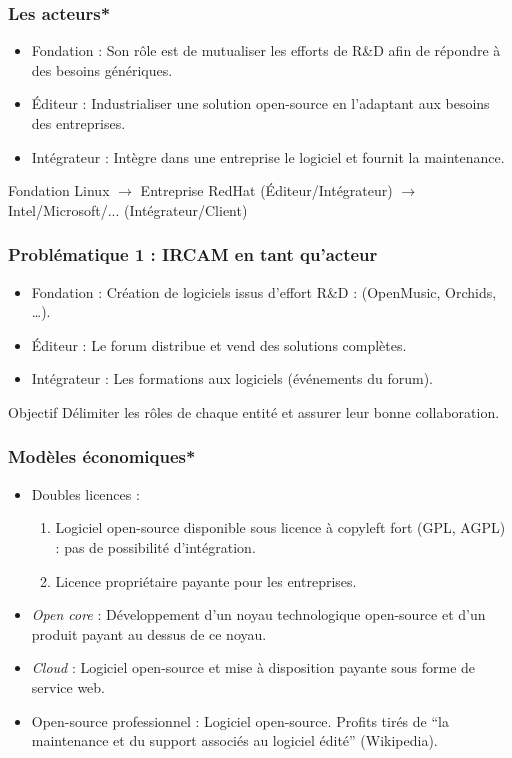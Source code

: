 \documentclass[xcolor=dvipsnames]{beamer}
\begin{document}
\begin{frame}[fragile]
\frametitle{Les acteurs*}

\begin{itemize}
\item Fondation : Son rôle est de mutualiser les efforts de R\&D afin de répondre à des besoins génériques.
\item Éditeur : Industrialiser une solution open-source en l'adaptant aux besoins des entreprises.
\item Intégrateur : Intègre dans une entreprise le logiciel et fournit la maintenance.
\end{itemize}

\begin{example}
Fondation Linux $\rightarrow$ Entreprise RedHat (Éditeur/Intégrateur) $\rightarrow$ Intel/Microsoft/... (Intégrateur/Client)
\end{example}

\end{frame}

\begin{frame}
\frametitle{Problématique 1 : IRCAM en tant qu'acteur}

\begin{itemize}
\item Fondation : Création de logiciels issus d'effort R\&D : (OpenMusic, Orchids, \ldots).
\item Éditeur : Le forum distribue et vend des solutions complètes.
\item Intégrateur : Les formations aux logiciels (événements du forum).
\end{itemize}

\begin{block}{Objectif}
Délimiter les rôles de chaque entité et assurer leur bonne collaboration.
\end{block}
\end{frame}

\begin{frame}
\frametitle{Modèles économiques*}

\begin{itemize}
\item Doubles licences :
  \begin{enumerate}
  \item Logiciel open-source disponible sous licence à copyleft fort (GPL, AGPL) : pas de possibilité d'intégration.
  \item Licence propriétaire payante pour les entreprises.
  \end{enumerate}
\item \textit{Open core} : Développement d'un noyau technologique open-source et d'un produit payant au dessus de ce noyau.
\item \textit{Cloud} : Logiciel open-source et mise à disposition payante sous forme de service web.
\item Open-source professionnel : Logiciel open-source. Profits tirés de ``la maintenance et du support associés au logiciel édité'' (Wikipedia).
\end{itemize}
\end{frame}
\end{document}
